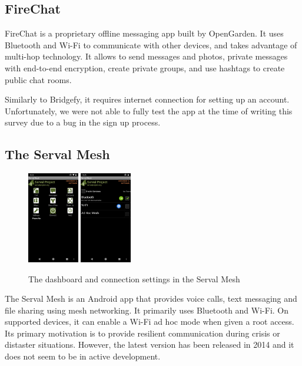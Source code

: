 \documentclass[conference,compsoc]{IEEEtran}
\begin{document}
\subsection{FireChat}
FireChat is a proprietary offline messaging app built by OpenGarden. It uses Bluetooth and Wi-Fi to communicate with other devices, and takes advantage of multi-hop technology. It allows to send messages and photos, private messages with end-to-end encryption, create private groups, and use hashtags to create public chat rooms. \cite{firechat}

Similarly to Bridgefy, it requires internet connection for setting up an account. Unfortunately, we were not able to fully test the app at the time of writing this survey due to a bug in the sign up process.

\subsection{The Serval Mesh}

\begin{figure}[h]
  \centering
  \includegraphics[width=0.2\textwidth]{serval1} \includegraphics[width=0.2\textwidth]{serval2} 
  \caption{The dashboard and connection settings in the Serval Mesh}
\end{figure}


The Serval Mesh is an Android app that provides voice calls, text messaging and file sharing using mesh networking. It primarily uses Bluetooth and Wi-Fi. On supported devices, it can enable a Wi-Fi ad hoc mode when given a root access. Its primary motivation is to provide resilient communication during crisis or distaster situations. However, the latest version has been released in 2014 and it does not seem to be in active development.
\end{document}
